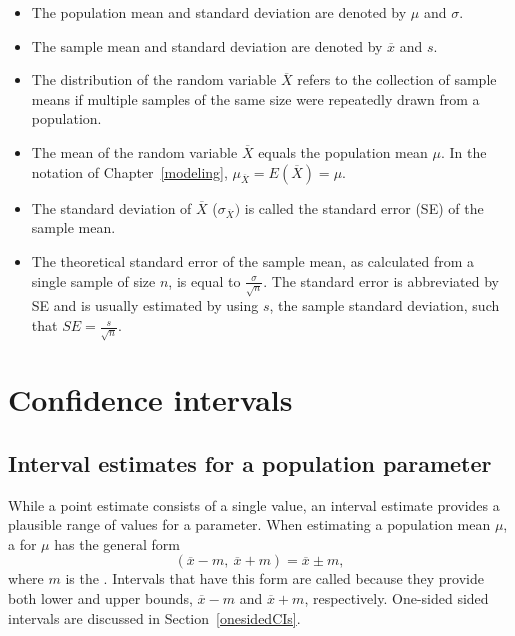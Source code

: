 \begin{termBox}{
\begin{itemize}
	\setlength{\itemsep}{0mm}	
	\item The population mean and standard deviation are denoted by $\mu$ and $\sigma$. 
	
	\item The sample mean and standard deviation are denoted by $\overline{x}$ and $s$. 
	
	\item The distribution of the random variable $\overline{X}$ refers to the collection of sample means if multiple samples of the same size were repeatedly drawn from a population. 
	
	\item The mean of the random variable $\overline{X}$ equals the population mean $\mu$.  In the notation of Chapter~\ref{modeling}, $\mu_{\overline{X}} = E(\overline{X}) = \mu$.
	
	\item  The standard deviation of $\overline{X}$ ($\sigma_{\overline{X}})$ is called the standard error (SE) of the sample mean. 
	
	\item The theoretical standard error of the sample mean, as calculated from a single sample of size $n$, is equal to $\frac{\sigma}{\sqrt{n}}$. The standard error is abbreviated by SE and is usually estimated by using $s$, the sample standard deviation, such that $SE = \frac{s}{\sqrt{n}}$.
	
\end{itemize}
	}
\end{termBox}


\newpage


\section[Confidence intervals]{Confidence intervals}
\label{confidenceIntervals}
\subsection{Interval estimates for a population parameter}

While a point estimate consists of a single value, an interval estimate provides a plausible range of values for a parameter. When estimating a population mean $\mu$, a  for $\mu$ has the general form
\[(\overline{x} -m, \ \overline{x} + m) = \overline{x} \pm m, \]
where $m$ is the . Intervals that have this form are called  because they provide both lower and upper bounds, $\overline{x} - m$ and $\overline{x} + m$, respectively. One-sided sided intervals are discussed in Section~\ref{onesidedCIs}.

